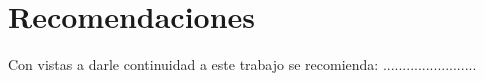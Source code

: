 \chapter*{Recomendaciones}
Con vistas a darle continuidad a este trabajo se recomienda: 
........................